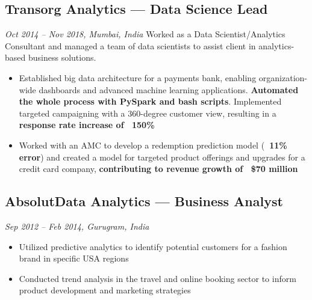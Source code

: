 \documentclass[a4paper,10pt]{article}
\begin{document}
\subsection*{Transorg Analytics — Data Science Lead}
\textit{Oct 2014 – Nov 2018, Mumbai, India}
Worked as a Data Scientist/Analytics Consultant and managed a team of data scientists to assist client in analytics-based business solutions.
\begin{itemize}[leftmargin=1em]
    \item Established big data architecture for a payments bank, enabling organization-wide dashboards and advanced machine learning applications. \textbf{Automated the whole process with PySpark and bash scripts}. Implemented targeted campaigning with a 360-degree customer view, resulting in a \textbf{response rate increase of ~150\%}
    \item Worked with an AMC to develop a redemption prediction model (\textbf{~11\% error}) and created a model for targeted product offerings and upgrades for a credit card company, \textbf{contributing to revenue growth of ~\$70 million}
\end{itemize}

\subsection*{AbsolutData Analytics — Business Analyst}
\textit{Sep 2012 – Feb 2014, Gurugram, India}
\begin{itemize}[leftmargin=1em]
    \item Utilized predictive analytics to identify potential customers for a fashion brand in specific USA regions
    \item Conducted trend analysis in the travel and online booking sector to inform product development and marketing strategies
\end{itemize}
\end{document}
